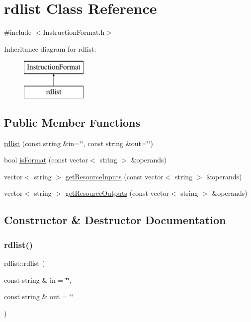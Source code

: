 \hypertarget{classrdlist}{}\section{rdlist Class Reference}
\label{classrdlist}


{\ttfamily \#include $<$Instruction\+Format.\+h$>$}

Inheritance diagram for rdlist\+:\begin{figure}[H]
\begin{center}
\leavevmode
\includegraphics[height=2.000000cm]{classrdlist}
\end{center}
\end{figure}
\subsection*{Public Member Functions}
\begin{DoxyCompactItemize}
\item 
\hyperlink{classrdlist_a568bd733af56fe1515010cb624f4a684}{rdlist} (const string \&in=\char`\"{}\char`\"{}, const string \&out=\char`\"{}\char`\"{})
\item 
bool \hyperlink{classrdlist_a14fd300b1148e07a48853f79cc8bdb2a}{is\+Format} (const vector$<$ string $>$ \&operands)
\item 
vector$<$ string $>$ \hyperlink{classrdlist_a6323881f795a77f99a05cdbea09f3a8b}{get\+Resource\+Inputs} (const vector$<$ string $>$ \&operands)
\item 
vector$<$ string $>$ \hyperlink{classrdlist_a5757c02c361945639b7c5f11f93a5e37}{get\+Resource\+Outputs} (const vector$<$ string $>$ \&operands)
\end{DoxyCompactItemize}


\subsection{Constructor \& Destructor Documentation}
\mbox{\label{classrdlist_a568bd733af56fe1515010cb624f4a684}} 
\subsubsection{\texorpdfstring{rdlist()}{rdlist()}}
{\footnotesize\ttfamily rdlist\+::rdlist (\begin{DoxyParamCaption}\item[{const string \&}]{in = {\ttfamily \char`\"{}\char`\"{}},  }\item[{const string \&}]{out = {\ttfamily \char`\"{}\char`\"{}} }\end{DoxyParamCaption})}

